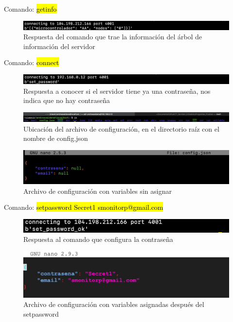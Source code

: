 Comando: \hl{getinfo}
\begin{figure}[H]
	\centering
	\includegraphics[scale=.5]{Capitulo5/images/get_info.png}
	\caption{Respuesta del comando que trae la información del árbol de información del servidor}
	\label{fig:}
\end{figure} 

Comando: \hl{connect}
\begin{figure}[H]
	\centering
	\includegraphics[scale=.5]{Capitulo5/images/connect.png}
	\caption{Respuesta a conocer si el servidor tiene ya una contraseña, nos indica que no hay contraseña}
	\label{fig:}
\end{figure} 

\begin{figure}[H]
	\centering
	\includegraphics[scale=.35]{Capitulo5/images/listconfig.png}
	\caption{Ubicación del archivo de configuración, en el directorio raíz con el nombre de config.json}
	\label{fig:}
\end{figure} 

\begin{figure}[H]
	\centering
	\includegraphics[scale=.5]{Capitulo5/images/nullconfig.png}
	\caption{Archivo de configuración con variables sin asignar}
	\label{fig:}
\end{figure} 

Comando: \hl{setpassword Secret1 smonitorp@gmail.com}
\begin{figure}[H]
	\centering
	\includegraphics[scale=.5]{Capitulo5/images/set_password.png}
	\caption{Respuesta al comando que configura la contraseña}
	\label{fig:}
\end{figure} 

\begin{figure}[H]
	\centering
	\includegraphics[scale=.6]{Capitulo5/images/setconfig.png}
	\caption{Archivo de configuración con variables asignadas después del setpassword}
	\label{fig:}
\end{figure} 

